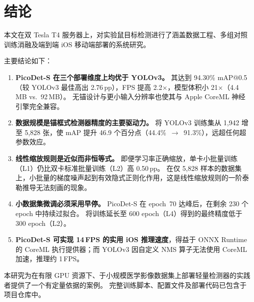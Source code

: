 \section{结论}
\label{sec:conclusion}

本文在双 Tesla T4 服务器上，对实验鼠目标检测进行了涵盖数据工程、多组对照训练消融及端到端 iOS 移动端部署的系统研究。

主要结论如下：

\begin{enumerate}[leftmargin=1.5em]
  \item \textbf{PicoDet-S 在三个部署维度上均优于 YOLOv3。}
    其达到 94.30\% mAP@0.5（较 YOLOv3 最佳高出 2.76\,pp），FPS 提高 2.2$\times$，模型体积小 21$\times$（4.4\,MB vs.\ 92\,MB）。
    无锚设计与更小输入分辨率也使其与 Apple CoreML 神经引擎完全兼容。

  \item \textbf{数据规模是锚框式检测器精度的主要驱动力。}
    将 YOLOv3 训练集从 1,942 增至 5,828 张，使 mAP 提升 46.9 个百分点（44.4\%~$\to$~91.3\%），远超任何超参数效应。

  \item \textbf{线性缩放规则是近似而非恒等式。}
    即便学习率正确缩放，单卡小批量训练（L1）仍比双卡标准批量训练（L2）高 0.50\,pp。
    在仅 5,828 样本的数据集上，小批量的梯度噪声起到有效隐式正则化作用，这是线性缩放规则的一阶泰勒推导无法刻画的现象。

  \item \textbf{小数据集微调必须采用早停。}
    PicoDet-S 在 epoch~70 达峰后，在剩余 230 个 epoch 中持续过拟合。
    将训练延长至 600 epoch（L4）得到的最终精度低于 300 epoch（L2）。

  \item \textbf{PicoDet-S 可实现 14\,FPS 的实用 iOS 推理速度}，得益于 ONNX Runtime 的 CoreML 执行提供器；而 YOLOv3 因自定义 NMS 算子无法使用 CoreML 加速，推理约 1\,FPS。
\end{enumerate}

本研究为在有限 GPU 资源下、于小规模医学影像数据集上部署轻量检测器的实践者提供了一个有定量依据的案例。
完整训练脚本、配置文件及部署代码已包含于项目仓库中。
